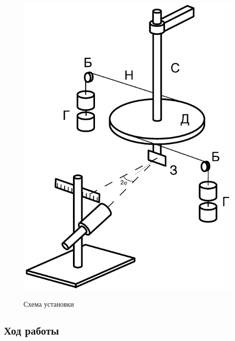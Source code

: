 \documentclass[a4paper, 12pt]{article}
\newcommand{\RomanNumeralCaps}[1]
    {\MakeUppercase{\romannumeral #1}}
\begin{document}
    \begin{figure}[H]
        \begin{center}
            \includegraphics[scale=0.40]{ust1.png}
            \begin{center}
                \caption{Схема установки \RomanNumeralCaps{1}}
            \end{center}
            \label{graphic1b}
        \end{center}
    \end{figure}

    \begin{center}
        \subsection*{Ход работы}
    \end{center}
\end{document}
